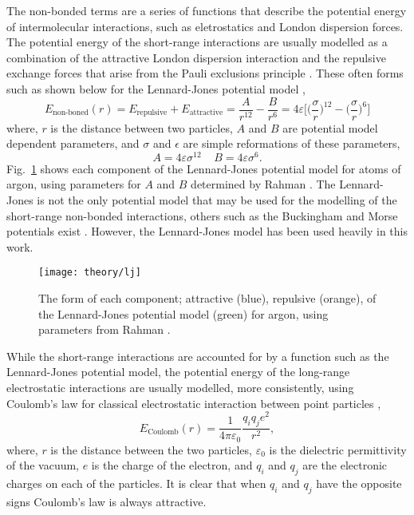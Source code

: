 The non-bonded terms are a series of functions that describe the potential energy of intermolecular interactions, such as eletrostatics and London dispersion forces.
The potential energy of the short-range interactions are usually modelled as a combination of the attractive London dispersion interaction and the repulsive exchange forces that arise from the Pauli exclusions principle \cite{Leach1996}.
These often forms such as shown below for the Lennard-Jones potential model \cite{LennardJones1924},
%
\begin{equation}
  E_{\text{non-boned}}(r) = E_{\text{repulsive}} + E_{\text{attractive}} = \frac{A}{r^{12}} - \frac{B}{r^6} = 4\varepsilon\Bigg[\bigg(\frac{\sigma}{r}\bigg)^{12} - \bigg(\frac{\sigma}{r}\bigg)^6\Bigg]
\end{equation}
%
where, $r$ is the distance between two particles, $A$ and $B$ are potential model dependent parameters, and $\sigma$ and $\epsilon$ are simple reformations of these parameters,
%
\begin{equation}
  A = 4\varepsilon\sigma^{12} \;\;\;\; B = 4\varepsilon\sigma^6.
\end{equation}
%
Fig.~\ref{fig:lj} shows each component of the Lennard-Jones potential model for atoms of argon, using parameters for $A$ and $B$ determined by Rahman \cite{Rahman1964}.
The Lennard-Jones is not the only potential model that may be used for the modelling of the short-range non-bonded interactions, others such as the Buckingham and Morse potentials exist \cite{Buckingham1938, Morse1929}.
However, the Lennard-Jones model has been used heavily in this work.
%
\begin{figure}
	\centering
	\texttt{[image: theory/lj]}
	\caption{The form of each component; attractive (blue), repulsive (orange), of the Lennard-Jones potential model (green) for argon, using parameters from Rahman \cite{Rahman1964}.}
	\label{fig:lj}
\end{figure}
%

While the short-range interactions are accounted for by a function such as the Lennard-Jones potential model, the potential energy of the long-range electrostatic interactions are usually modelled, more consistently, using Coulomb's law for classical electrostatic interaction between point particles \cite{Coulomb1788, Coulomb1788a},
%
\begin{equation}
  E_{\text{Coulomb}}(r) = \frac{1}{4\pi\varepsilon_0}{\frac{q_iq_je^2}{r^2}},
\end{equation}
%
where, $r$ is the distance between the two particles, $\varepsilon_0$ is the dielectric permittivity of the vacuum, $e$ is the charge of the electron, and $q_i$ and $q_j$ are the electronic charges on each of the particles.
It is clear that when $q_i$ and $q_j$ have the opposite signs Coulomb's law is always attractive.

